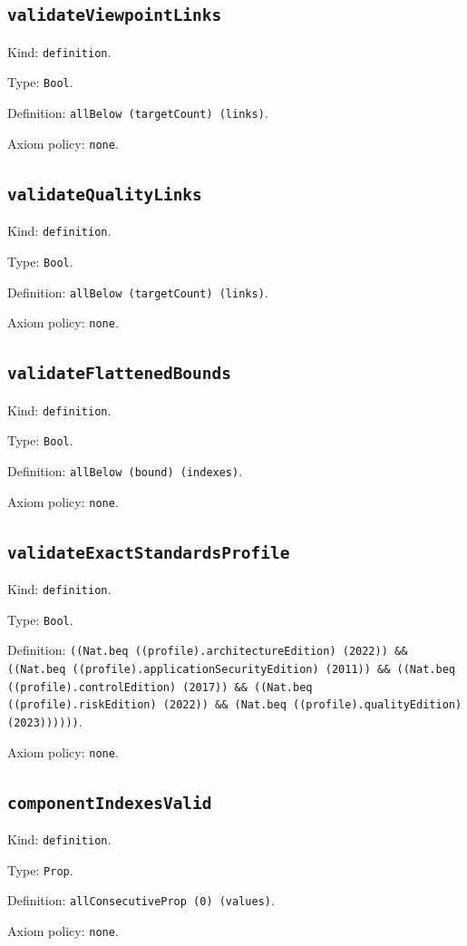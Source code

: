 \documentclass[11pt]{article}
\begin{document}
\subsection*{\texttt{validateViewpointLinks}}
\noindent Kind: \texttt{definition}.\par
\noindent Type: \texttt{Bool}.\par
\noindent Definition: \texttt{allBelow (targetCount) (links)}.\par
\noindent Axiom policy: \texttt{none}.\par
\subsection*{\texttt{validateQualityLinks}}
\noindent Kind: \texttt{definition}.\par
\noindent Type: \texttt{Bool}.\par
\noindent Definition: \texttt{allBelow (targetCount) (links)}.\par
\noindent Axiom policy: \texttt{none}.\par
\subsection*{\texttt{validateFlattenedBounds}}
\noindent Kind: \texttt{definition}.\par
\noindent Type: \texttt{Bool}.\par
\noindent Definition: \texttt{allBelow (bound) (indexes)}.\par
\noindent Axiom policy: \texttt{none}.\par
\subsection*{\texttt{validateExactStandardsProfile}}
\noindent Kind: \texttt{definition}.\par
\noindent Type: \texttt{Bool}.\par
\noindent Definition: \texttt{((Nat.beq ((profile).architectureEdition) (2022)) \&\& ((Nat.beq ((profile).applicationSecurityEdition) (2011)) \&\& ((Nat.beq ((profile).controlEdition) (2017)) \&\& ((Nat.beq ((profile).riskEdition) (2022)) \&\& (Nat.beq ((profile).qualityEdition) (2023))))))}.\par
\noindent Axiom policy: \texttt{none}.\par
\subsection*{\texttt{componentIndexesValid}}
\noindent Kind: \texttt{definition}.\par
\noindent Type: \texttt{Prop}.\par
\noindent Definition: \texttt{allConsecutiveProp (0) (values)}.\par
\noindent Axiom policy: \texttt{none}.\par
\end{document}

